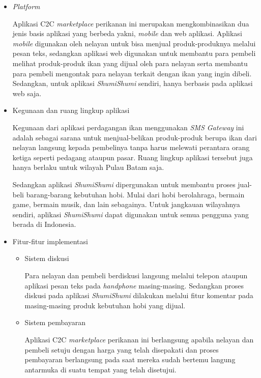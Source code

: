 \documentclass[a4paper]{article}
\begin{document}
\begin{itemize}
\begin{enumerate}
        \begin{itemize}
            \item \textit{Platform}
    
            Aplikasi C2C \textit{marketplace} perikanan ini merupakan mengkombinasikan dua jenis basis aplikasi yang berbeda yakni, \textit{mobile} dan web aplikasi. Aplikasi \textit{mobile} digunakan oleh nelayan untuk bisa menjual produk-produknya melalui pesan teks, sedangkan aplikasi web digunakan untuk membantu para pembeli melihat produk-produk ikan yang dijual oleh para nelayan serta membantu para pembeli mengontak para nelayan terkait dengan ikan yang ingin dibeli\autocite{c2c-fish-marketplace}. Sedangkan, untuk aplikasi \textit{ShumiShumi} sendiri, hanya berbasis pada aplikasi web saja.
    
            \item Kegunaan dan ruang lingkup aplikasi
    
            Kegunaan dari aplikasi perdagangan ikan menggunakan \textit{SMS Gateway} ini adalah sebagai sarana untuk menjual-belikan produk-produk berupa ikan dari nelayan langsung kepada pembelinya tanpa harus melewati perantara orang ketiga seperti pedagang ataupun pasar. Ruang lingkup aplikasi tersebut juga hanya berlaku untuk wilayah Pulau Batam saja\autocite{c2c-fish-marketplace}.
    
            Sedangkan aplikasi \textit{ShumiShumi} dipergunakan untuk membantu proses jual-beli barang-barang kebutuhan hobi. Mulai dari hobi berolahraga, bermain game, bermain musik, dan lain sebagainya. Untuk jangkauan wilayahnya sendiri, aplikasi \textit{ShumiShumi} dapat digunakan untuk semua pengguna yang berada di Indonesia.
    
            \item Fitur-fitur implementasi
    
            \begin{itemize}
                \item Sistem diskusi
    
                Para nelayan dan pembeli berdiskusi langsung melalui telepon ataupun aplikasi pesan teks pada \textit{handphone} masing-masing\autocite{c2c-fish-marketplace}. Sedangkan proses diskusi pada aplikasi \textit{ShumiShumi} dilakukan melalui fitur komentar pada masing-masing produk kebutuhan hobi yang dijual.
    
                \item Sistem pembayaran
    
                Aplikasi C2C \textit{marketplace} perikanan ini berlangsung apabila nelayan dan pembeli setuju dengan harga yang telah disepakati dan proses pembayaran berlangsung pada saat mereka sudah bertemu langung antarmuka di suatu tempat yang telah disetujui\autocite{c2c-fish-marketplace}.
    

\end{itemize}
\end{itemize}
\end{enumerate}
\end{itemize}
\end{document}
